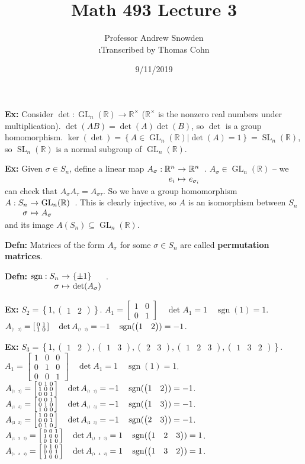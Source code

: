 \documentclass[10pt,letterpaper]{article}
\author{Professor Andrew Snowden\\ \small\i{Transcribed by Thomas Cohn}}
\title{Math 493 Lecture 3}
\date{9/11/2019} %
\newcommand{\n}{\hfill\break}
\newcommand{\hangblock}[2]{\par\noindent\settowidth{\hangindent}{\textbf{#1: }}\textbf{#1: }\!\!\!#2}
\newcommand{\defn}[1]{\hangblock{Defn}{#1}}
\newcommand{\ex}[1]{\hangblock{Ex}{#1}}
\newcommand{\set}[1]{\left\{#1\right\}}
\newcommand{\reals}{\mathbb{R}}
\newcommand{\R}{\reals}
\DeclareMathOperator{\sgn}{sgn}
\newcommand{\map}[4]{\!\!\!\begin{array}[t]{rcl}#1 & \!\!\!\!\to & \!\!\!\!#2\\ #3 & \!\!\!\!\mapsto & \!\!\!\!#4\end{array}}
\DeclareMathOperator{\GL}{GL}
\newcommand{\smallBMatrix}[1]{\brack{\begin{smallmatrix}#1\end{smallmatrix}}}
\newcommand{\cycle}[1]{\begin{pmatrix}#1\end{pmatrix}}
\newcommand{\subscriptcycle}[1]{\scaleto{\cycle{#1}}{5pt}}
\DeclareMathOperator{\SL}{SL}
\renewcommand{\brack}[1]{\left[#1\right]}
\begin{document}
\maketitle
\setlength\RaggedRightParindent{\parindent}
\RaggedRight

\ex{
	Consider $\det:\GL_{n}(\R)\to\R^{\times}$ ($\R^{\times}$ is the nonzero real numbers under multiplication).\n
	$\det(AB)=\det(A)\det(B)$, so $\det$ is a group homomorphism.\n
	$\ker(\det)=\set{A\in\GL_{n}(\R)|\det(A)=1}=\SL_{n}(\R)$, so $\SL_{n}(\R)$ is a normal subgroup of $\GL_{n}(\R)$.\n
}

\ex{
	Given $\sigma\in{}S_{n}$, define a linear map $\map{A_{\sigma}:\R^{n}}{\R^{n}}{e_{i}}{e_{\sigma_{i}}}$.\n
	$A_{\sigma}\in\GL_{n}(\R)$ -- we can check that $A_{\sigma}A_{\tau}=A_{\sigma\tau}$.\n
	So we have a group homomorphism $\map{A:S_{n}}{\GL_{n}(\R)}{\sigma}{A_{\sigma}}$.\n
	This is clearly injective, so $A$ is an isomorphism between $S_{n}$ and its image $A(S_{n})\subseteq\GL_{n}(\R)$.
}

\defn{
	Matrices of the form $A_{\sigma}$ for some $\sigma\in{}S_{n}$ are called \textbf{permutation matrices}.
}

\defn{
	$\map{\sgn:S_{n}}{\set{\pm{}1}}{\sigma}{\det(A_{\sigma})}$.
}

\ex{
	$S_{2}=\set{1,\cycle{1 & 2}}$.\n
	$A_{1}=\smallBMatrix{1 & 0\\ 0 & 1}\quad\det{}A_{1}=1\quad\sgn(1)=1$.\n
	$A_{\scaleto{\cycle{1 & 2}}{5pt}}=\smallBMatrix{0 & 1\\ 1 & 0}\quad\det{}A_{\scaleto{\cycle{1 & 2}}{5pt}}=-1\quad\sgn(\cycle{1 & 2})=-1$.\n
}

\ex{
	$S_{3}=\set{1, \cycle{1 & 2}, \cycle{1 & 3}, \cycle{2 & 3}, \cycle{1 & 2 & 3}, \cycle{1 & 3 & 2}}$.\n
	$A_{1}=\smallBMatrix{1 & 0 & 0\\ 0 & 1 & 0\\ 0 & 0 & 1}\quad\det{}A_{1}=1\quad\sgn(1)=1$.\n
	$A_{\subscriptcycle{1 & 2}}=\smallBMatrix{0 & 1 & 0\\ 1 & 0 & 0\\ 0 & 0 & 1}\quad\det{}A_{\subscriptcycle{1 & 2}}=-1\quad\sgn(\cycle{1 & 2})=-1$.\n
	$A_{\subscriptcycle{1 & 3}}=\smallBMatrix{0 & 0 & 1\\ 0 & 1 & 0\\ 1 & 0 & 0}\quad\det{}A_{\subscriptcycle{1 & 3}}=-1\quad\sgn(\cycle{1 & 3})=-1$.\n
	$A_{\subscriptcycle{2 & 3}}=\smallBMatrix{1 & 0 & 0\\ 0 & 0 & 1\\ 0 & 1 & 0}\quad\det{}A_{\subscriptcycle{2 & 3}}=-1\quad\sgn(\cycle{2 & 3})=-1$.\n
	$A_{\subscriptcycle{1 & 2 & 3}}=\smallBMatrix{0 & 0 & 1\\ 1 & 0 & 0\\ 0 & 1 & 0}\quad\det{}A_{\subscriptcycle{1 & 2 & 3}}=1\quad\sgn(\cycle{1 & 2 & 3})=1$.\n
	$A_{\subscriptcycle{1 & 3 & 2}}=\smallBMatrix{0 & 1 & 0\\ 0 & 0 & 1\\ 1 & 0 & 0}\quad\det{}A_{\subscriptcycle{1 & 3 & 2}}=1\quad\sgn(\cycle{1 & 3 & 2})=1$.\n
}
\end{document}
